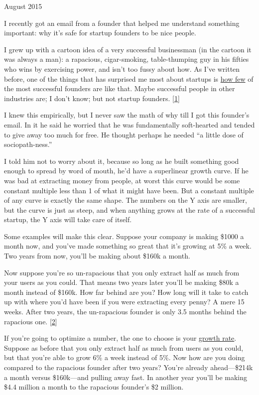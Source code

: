 August 2015

I recently got an email from a founder that helped me understand
something important: why it's safe for startup founders to be nice
people.

I grew up with a cartoon idea of a very successful businessman (in the
cartoon it was always a man): a rapacious, cigar-smoking, table-thumping
guy in his fifties who wins by exercising power, and isn't too fussy
about how. As I've written before, one of the things that has surprised
me most about startups is \href{mean.html}{how few} of the most
successful founders are like that. Maybe successful people in other
industries are; I don't know; but not startup founders.
{[}\hyperref[f1n]{1}{]}

I knew this empirically, but I never saw the math of why till I got this
founder's email. In it he said he worried that he was fundamentally
soft-hearted and tended to give away too much for free. He thought
perhaps he needed ``a little dose of sociopath-ness.''

I told him not to worry about it, because so long as he built something
good enough to spread by word of mouth, he'd have a superlinear growth
curve. If he was bad at extracting money from people, at worst this
curve would be some constant multiple less than 1 of what it might have
been. But a constant multiple of any curve is exactly the same shape.
The numbers on the Y axis are smaller, but the curve is just as steep,
and when anything grows at the rate of a successful startup, the Y axis
will take care of itself.

Some examples will make this clear. Suppose your company is making
\$1000 a month now, and you've made something so great that it's growing
at 5\% a week. Two years from now, you'll be making about \$160k a
month.

Now suppose you're so un-rapacious that you only extract half as much
from your users as you could. That means two years later you'll be
making \$80k a month instead of \$160k. How far behind are you? How long
will it take to catch up with where you'd have been if you were
extracting every penny? A mere 15 weeks. After two years, the
un-rapacious founder is only 3.5 months behind the rapacious one.
{[}\hyperref[f2n]{2}{]}

If you're going to optimize a number, the one to choose is your
\href{growth.html}{growth rate}. Suppose as before that you only extract
half as much from users as you could, but that you're able to grow 6\% a
week instead of 5\%. Now how are you doing compared to the rapacious
founder after two years? You're already ahead---\$214k a month versus
\$160k---and pulling away fast. In another year you'll be making \$4.4
million a month to the rapacious founder's \$2 million.

